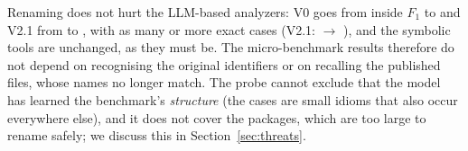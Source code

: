 Renaming does not hurt the LLM-based analyzers: V0 goes from inside $F_1$
 to  and V2.1 from
 to , with as many or more
exact cases (V2.1:  $\rightarrow$
), and the symbolic tools are unchanged, as they
must be. The micro-benchmark results therefore do not depend on recognising
the original identifiers or on recalling the published 
files, whose names no longer match. The probe cannot exclude that the model has
learned the benchmark's \emph{structure} (the cases are small idioms that also
occur everywhere else), and it does not cover the packages, which are too large
to rename safely; we discuss this in Section~\ref{sec:threats}.
